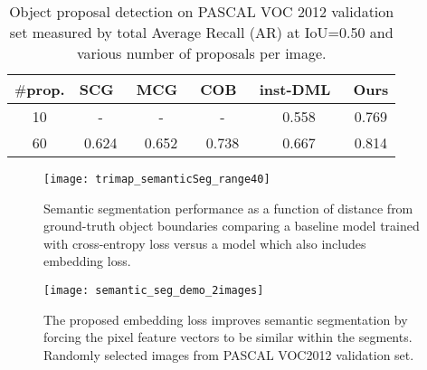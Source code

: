{
\setlength{\tabcolsep}{0.25em}
\begin{table}%
\centering
{\footnotesize
\begin{tabular}{c | c c c  c |  c  }
\hline
 $\#$prop. & SCG~\cite{pont2017multiscale}
                     & MCG~\cite{pont2017multiscale}
                     & COB~\cite{maninis2017convolutional}
                     & inst-DML~\cite{fathi2017semantic}
                     & Ours      \\
\hline
10               & -            & -         & -     &  0.558     & 0.769 \\
60               & 0.624        & 0.652     & 0.738 &  0.667     & 0.814 \\
\hline
\end{tabular}
}
\vspace{-3mm}
\caption{Object proposal detection on PASCAL VOC 2012 validation set measured
by total Average Recall (AR) at IoU=0.50 and various number of proposals per image.}
\vspace{-2mm}
\label{tab:objProposalDet}
\end{table}
}



\begin{figure}[t]
\centering
   \texttt{[image: trimap\_semanticSeg\_range40]} %
   \vspace{-2mm}
   \caption{Semantic segmentation performance as a function of distance from ground-truth
   object boundaries comparing a baseline model trained with cross-entropy loss versus a
   model which also includes embedding loss.
   }
\label{fig:trimap_semanticSeg}
\vspace{-1mm}
\end{figure}

\begin{figure}[t]
\centering
   \texttt{[image: semantic\_seg\_demo\_2images]} %
   \vspace{-5mm}
   \caption{The proposed embedding loss improves semantic segmentation by
   forcing the pixel feature vectors to be similar within the segments.
   Randomly selected images from PASCAL VOC2012 validation set.}
\label{fig:semantic_seg_demo}
\vspace{-3mm}
\end{figure}

